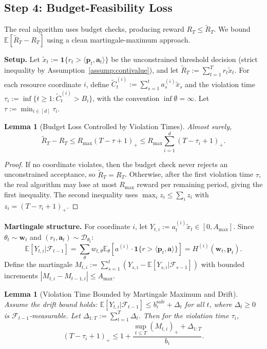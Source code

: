\documentclass[11pt]{article}
\newtheorem{lemma}[theorem]{Lemma}
\newcommand{\ba}{\mathbf{a}}
\newcommand{\bp}{\mathbf{p}}
\newcommand{\bw}{\mathbf{w}}
\newcommand{\E}{\mathbb{E}}
\newcommand{\cD}{\mathcal{D}}
\newcommand{\cF}{\mathcal{F}}
\begin{document}
\subsection{Step 4: Budget-Feasibility Loss}

The real algorithm uses budget checks, producing reward $R_T \le \tilde{R}_T$. We bound $\E[\tilde{R}_T - R_T]$ using a clean martingale-maximum approach.

\textbf{Setup.} Let $\tilde{x}_t := \mathbf{1}\{r_t > \langle \bp_t, \ba_t \rangle\}$ be the unconstrained threshold decision (strict inequality by Assumption~\ref{assump:contivalue}), and let $\tilde{R}_T := \sum_{t=1}^T r_t \tilde{x}_t$. For each resource coordinate $i$, define $\tilde{C}_t^{(i)} := \sum_{s=1}^t a_s^{(i)} \tilde{x}_s$ and the violation time $\tau_i := \inf\{t \ge 1 : \tilde{C}_t^{(i)} > B_i\}$, with the convention $\inf \emptyset = \infty$. Let $\tau := \min_{i \in [d]} \tau_i$.

\begin{lemma}[Budget Loss Controlled by Violation Times]
\label{lem:budget-loss}
Almost surely,
\[
\tilde{R}_T - R_T \le R_{\max} (T - \tau + 1)_+ \le R_{\max} \sum_{i=1}^d (T - \tau_i + 1)_+.
\]
\end{lemma}

\begin{proof}
If no coordinate violates, then the budget check never rejects an unconstrained acceptance, so $\tilde{R}_T = R_T$. Otherwise, after the first violation time $\tau$, the real algorithm may lose at most $R_{\max}$ reward per remaining period, giving the first inequality. The second inequality uses $\max_i z_i \le \sum_i z_i$ with $z_i = (T - \tau_i + 1)_+$.
\end{proof}

\textbf{Martingale structure.} For coordinate $i$, let $Y_{t,i} := a_t^{(i)} \tilde{x}_t \in [0, A_{\max}]$. Since $\theta_t \sim \bw_t$ and $(r_t, \ba_t) \sim \cD_{\theta_t}$:
\[
\E[Y_{t,i} | \cF_{t-1}] = \sum_\theta w_{t,\theta} \E_\theta\left[a^{(i)} \cdot \mathbf{1}\{r > \langle \bp_t, \ba \rangle\}\right] = H^{(i)}(\bw_t, \bp_t).
\]
Define the martingale $M_{t,i} := \sum_{s=1}^t (Y_{s,i} - \E[Y_{s,i} | \cF_{s-1}])$ with bounded increments $|M_{t,i} - M_{t-1,i}| \le A_{\max}$.

\begin{lemma}[Violation Time Bounded by Martingale Maximum and Drift]
\label{lem:tau-bound}
Assume the drift bound holds: $\E[Y_{t,i} | \cF_{t-1}] \le b^{\mathrm{safe}}_i + \Delta_t$ for all $t$, where $\Delta_t \ge 0$ is $\cF_{t-1}$-measurable. Let $\Delta_{1:T} := \sum_{t=1}^T \Delta_t$. Then for the violation time $\tau_i$,
\[
(T - \tau_i + 1)_+ \le 1 + \frac{\sup_{t \le T} (M_{t,i})_+ + \Delta_{1:T}}{b_i}.
\]
\end{lemma}
\end{document}
